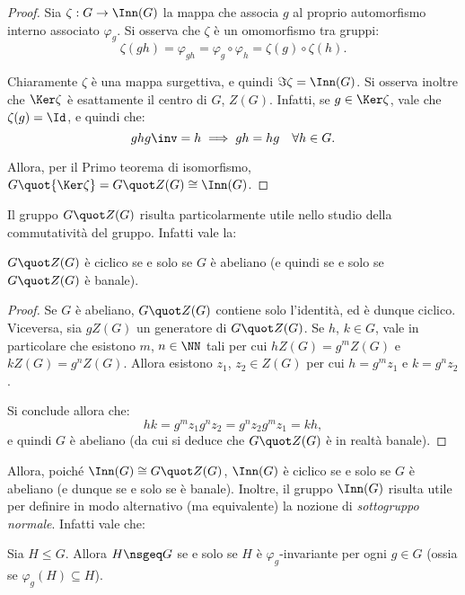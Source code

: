 \documentclass[12pt]{scrartcl}
\begin{document}
	\begin{proof}
		Sia $\zeta : G \to \Inn(G)$ la mappa che associa $g$ al proprio
		automorfismo interno associato $\varphi_g$. Si osserva che $\zeta$
		è un omomorfismo tra gruppi:
		\[ \zeta(gh) = \varphi_{gh} = \varphi_g \circ \varphi_h = \zeta(g) \circ \zeta(h). \]
		
		Chiaramente $\zeta$ è una mappa surgettiva, e quindi $\Im \zeta = \Inn(G)$.
		Si osserva inoltre che $\Ker \zeta$ è esattamente il centro di $G$, $Z(G)$. Infatti,
		se $g \in \Ker \zeta$, vale che $\zeta(g) = \Id$, e quindi che:
		\[ ghg\inv = h \implies gh=hg \quad \forall h \in G. \]
		
		Allora, per il Primo teorema di isomorfismo, $G \quot {\Ker \zeta} = G \quot Z(G) \cong \Inn(G)$.
	\end{proof} \bigskip


	Il gruppo $G \quot Z(G)$ risulta particolarmente utile nello studio della commutatività
	del gruppo. Infatti vale la:
	
	\begin{proposition}
		$G \quot Z(G)$ è ciclico se e solo se $G$ è abeliano (e quindi se e solo se $G \quot Z(G)$ è banale).
	\end{proposition}
	
	\begin{proof}
		Se $G$ è abeliano, $G \quot Z(G)$ contiene solo l'identità, ed è dunque ciclico.
		Viceversa, sia $g Z(G)$ un generatore di $G \quot Z(G)$.
		Se $h$, $k \in G$, vale in particolare che esistono $m$, $n \in \NN$ tali per cui
		$h Z(G) = g^m Z(G)$ e $k Z(G) = g^n Z(G)$. Allora esistono
		$z_1$, $z_2 \in Z(G)$ per cui $h = g^m z_1$ e $k = g^n z_2$. \bigskip


		Si conclude allora che:
		\[ hk = g^m z_1 g^n z_2 = g^n z_2 g^m z_1 = kh, \]
		e quindi $G$ è abeliano (da cui si deduce che $G \quot Z(G)$ è in realtà banale).
	\end{proof} \bigskip
	

	Allora, poiché $\Inn(G) \cong G \quot Z(G)$, $\Inn(G)$ è ciclico se e solo se
	$G$ è abeliano (e dunque se e solo se è banale). Inoltre, il gruppo $\Inn(G)$
	risulta utile per definire in modo alternativo (ma equivalente) la nozione
	di \textit{sottogruppo normale}. Infatti vale che:
	
	\begin{proposition}
		Sia $H \leq G$. Allora $H \nsgeq G$ se e solo se $H$ è $\varphi_g$-invariante
		per ogni $g \in G$ (ossia se $\varphi_g(H) \subseteq H$).
	\end{proposition}
	
\end{document}
